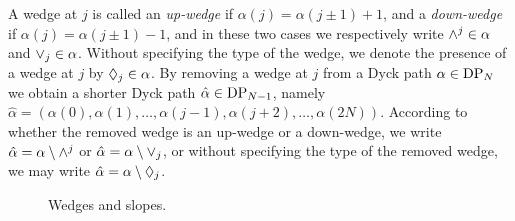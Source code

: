 \documentclass[oneside,english]{amsart}
\numberwithin{equation}{section}
\numberwithin{figure}{section}
\theoremstyle{plain}
\theoremstyle{plain}
\theoremstyle{plain}
\theoremstyle{remark}
\theoremstyle{plain}
\theoremstyle{plain}
\theoremstyle{plain}
\theoremstyle{plain}
\theoremstyle{plain}
\theoremstyle{plain}
\theoremstyle{plain}
\theoremstyle{plain}
\newcommand{\blue}[1]{{\color{blue} #1}}
\begin{document}
A wedge at $j$ is called an \emph{up-wedge} if $\alpha(j) = \alpha(j \pm 1) + 1$, and %
a \emph{down-wedge} if $\alpha(j) = \alpha(j \pm 1) - 1$,
and in these two cases we respectively write $\wedge^j \in \alpha$ and $\vee_j \in \alpha$.
Without specifying the type of the wedge, we denote
the presence of a wedge at $j$ %
by $\lozenge_j \in \alpha$.
By removing a wedge at $j$ from a Dyck path $\alpha \in \mathrm{DP}_N$ we obtain a shorter Dyck path
$\hat{\alpha} \in \mathrm{DP}_{N-1}$, namely
$\hat{\alpha} = (\alpha(0) , \alpha(1) , \ldots , \alpha(j-1) , \alpha(j+2) , \ldots , \alpha(2N))$.
According to whether the removed wedge is an up-wedge or a down-wedge, we %
write $\hat{\alpha} = \alpha \setminus \wedge^j$ or $\hat{\alpha} = \alpha \setminus \vee_j$,
or without specifying the type of the removed wedge, we may
write $\hat{\alpha} = \alpha \setminus \lozenge_j$.
\begin{figure}
\centering
{}
\caption{\label{fig: wedges and slopes}
Wedges and slopes.
}
\end{figure}
\end{document}
